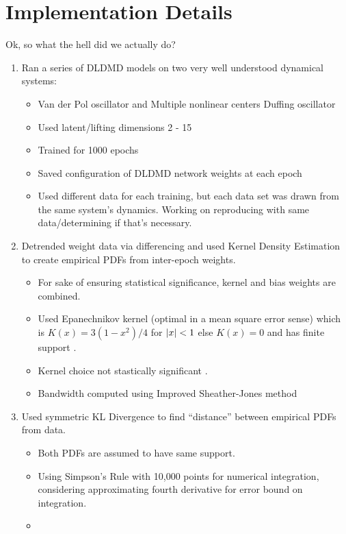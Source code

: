\section{Implementation Details}
Ok, so what the hell did we actually do?
\begin{enumerate}
  \item Ran a series of DLDMD models on two very well understood dynamical systems:
  \begin{itemize}
    \item Van der Pol oscillator and Multiple nonlinear centers Duffing oscillator
    \item Used latent/lifting dimensions 2 - 15
    \item Trained for 1000 epochs
    \item Saved configuration of DLDMD network weights at each epoch
    \item Used different data for each training, but each data set was drawn from 
    the same system's dynamics. Working on reproducing with same data/determining
    if that's necessary.
  \end{itemize}
  
  \item Detrended weight data via differencing and used Kernel Density Estimation to create
  empirical PDFs from inter-epoch weights.
  \begin{itemize}
    \item For sake of ensuring statistical significance, kernel and bias weights are combined.
    \item Used Epanechnikov kernel (optimal in a mean square error sense) which is $K(x) = 
    3(1-x^2)/4$ for $\left|x\right| < 1$ else $K(x) = 0$ and has finite support \cite{epanechnikov}.
    \item Kernel choice not stastically significant \cite{epanechnikov}.
    \item Bandwidth computed using Improved Sheather-Jones method \cite{botev}
  \end{itemize}

  \item Used symmetric KL Divergence to find ``distance'' between empirical PDFs from data.
  \begin{itemize}
    \item Both PDFs are assumed to have same support.
    \item Using Simpson's Rule with 10,000 points for numerical integration, considering approximating 
    fourth derivative for error bound on integration.
    \item 
  \end{itemize}
\end{enumerate}

